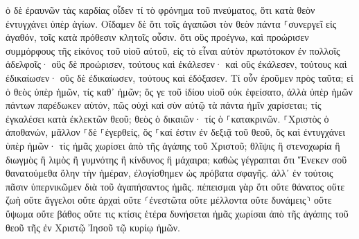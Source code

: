 \documentclass[twoside, 9pt]{extreport}
\begin{document}
ὁ δὲ ἐραυνῶν τὰς καρδίας οἶδεν τί τὸ φρόνημα τοῦ πνεύματος, ὅτι κατὰ θεὸν ἐντυγχάνει ὑπὲρ ἁγίων. 
Οἴδαμεν δὲ ὅτι τοῖς ἀγαπῶσι τὸν θεὸν πάντα ⸀συνεργεῖ εἰς ἀγαθόν, τοῖς κατὰ πρόθεσιν κλητοῖς οὖσιν. 
ὅτι οὓς προέγνω, καὶ προώρισεν συμμόρφους τῆς εἰκόνος τοῦ υἱοῦ αὐτοῦ, εἰς τὸ εἶναι αὐτὸν πρωτότοκον ἐν πολλοῖς ἀδελφοῖς· 
οὓς δὲ προώρισεν, τούτους καὶ ἐκάλεσεν· καὶ οὓς ἐκάλεσεν, τούτους καὶ ἐδικαίωσεν· οὓς δὲ ἐδικαίωσεν, τούτους καὶ ἐδόξασεν. 
Τί οὖν ἐροῦμεν πρὸς ταῦτα; εἰ ὁ θεὸς ὑπὲρ ἡμῶν, τίς καθ᾽ ἡμῶν; 
ὅς γε τοῦ ἰδίου υἱοῦ οὐκ ἐφείσατο, ἀλλὰ ὑπὲρ ἡμῶν πάντων παρέδωκεν αὐτόν, πῶς οὐχὶ καὶ σὺν αὐτῷ τὰ πάντα ἡμῖν χαρίσεται; 
τίς ἐγκαλέσει κατὰ ἐκλεκτῶν θεοῦ; θεὸς ὁ δικαιῶν· 
τίς ὁ ⸀κατακρινῶν. ⸀Χριστὸς ὁ ἀποθανών, μᾶλλον ⸀δὲ ⸀ἐγερθείς, ὅς ⸀καί ἐστιν ἐν δεξιᾷ τοῦ θεοῦ, ὃς καὶ ἐντυγχάνει ὑπὲρ ἡμῶν· 
τίς ἡμᾶς χωρίσει ἀπὸ τῆς ἀγάπης τοῦ Χριστοῦ; θλῖψις ἢ στενοχωρία ἢ διωγμὸς ἢ λιμὸς ἢ γυμνότης ἢ κίνδυνος ἢ μάχαιρα; 
καθὼς γέγραπται ὅτι Ἕνεκεν σοῦ θανατούμεθα ὅλην τὴν ἡμέραν, ἐλογίσθημεν ὡς πρόβατα σφαγῆς. 
ἀλλ᾽ ἐν τούτοις πᾶσιν ὑπερνικῶμεν διὰ τοῦ ἀγαπήσαντος ἡμᾶς. 
πέπεισμαι γὰρ ὅτι οὔτε θάνατος οὔτε ζωὴ οὔτε ἄγγελοι οὔτε ἀρχαὶ οὔτε ⸂ἐνεστῶτα οὔτε μέλλοντα οὔτε δυνάμεις⸃ 
οὔτε ὕψωμα οὔτε βάθος οὔτε τις κτίσις ἑτέρα δυνήσεται ἡμᾶς χωρίσαι ἀπὸ τῆς ἀγάπης τοῦ θεοῦ τῆς ἐν Χριστῷ Ἰησοῦ τῷ κυρίῳ ἡμῶν. 
\end{document}
